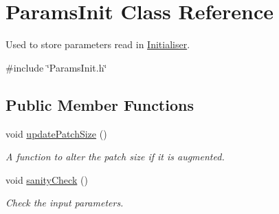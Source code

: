 \hypertarget{classParamsInit}{}\section{Params\+Init Class Reference}
\label{classParamsInit}


Used to store parameters read in \hyperlink{classInitialiser}{Initialiser}.  




{\ttfamily \#include \char`\"{}Params\+Init.\+h\char`\"{}}

\subsection*{Public Member Functions}
\begin{DoxyCompactItemize}
\item 
void \hyperlink{classParamsInit_aa3c0769a2a57329b230a93b8df4c99fd}{update\+Patch\+Size} ()
\begin{DoxyCompactList}\small\item\em A function to alter the patch size if it is augmented. \end{DoxyCompactList}\item 
void \hyperlink{classParamsInit_a83871ddd30d35b0b350730a6ed7c210f}{sanity\+Check} ()
\begin{DoxyCompactList}\small\item\em Check the input parameters. \end{DoxyCompactList}\end{DoxyCompactItemize}

